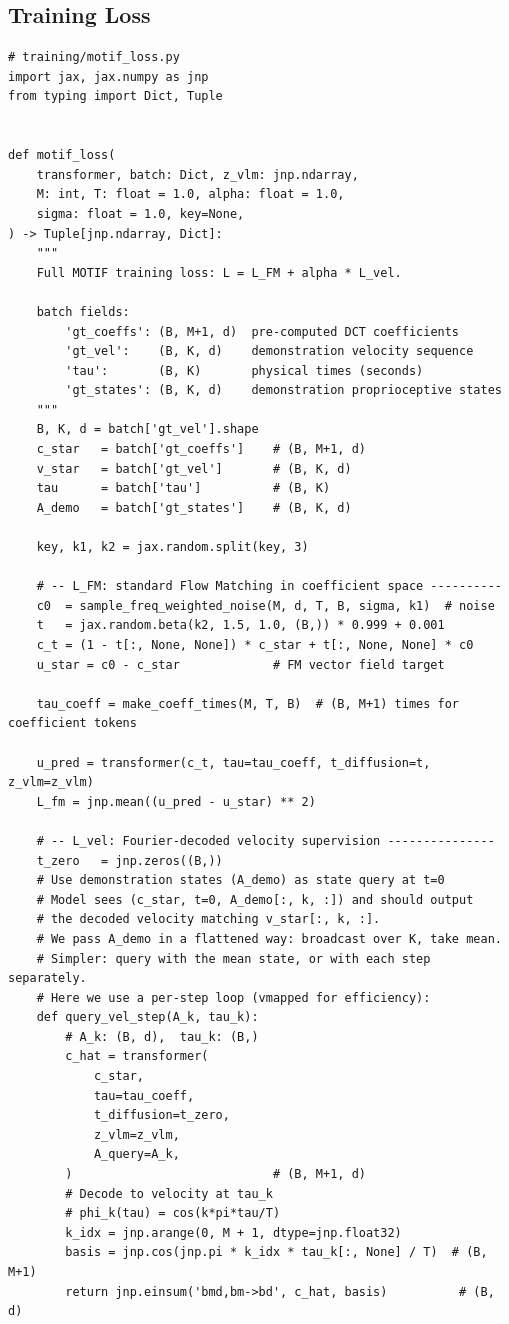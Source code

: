 \documentclass[11pt]{article}
\theoremstyle{plain}
\theoremstyle{definition}
\begin{document}
\subsection{Training Loss}

\begin{verbatim}
# training/motif_loss.py
import jax, jax.numpy as jnp
from typing import Dict, Tuple


def motif_loss(
    transformer, batch: Dict, z_vlm: jnp.ndarray,
    M: int, T: float = 1.0, alpha: float = 1.0,
    sigma: float = 1.0, key=None,
) -> Tuple[jnp.ndarray, Dict]:
    """
    Full MOTIF training loss: L = L_FM + alpha * L_vel.

    batch fields:
        'gt_coeffs': (B, M+1, d)  pre-computed DCT coefficients
        'gt_vel':    (B, K, d)    demonstration velocity sequence
        'tau':       (B, K)       physical times (seconds)
        'gt_states': (B, K, d)    demonstration proprioceptive states
    """
    B, K, d = batch['gt_vel'].shape
    c_star   = batch['gt_coeffs']    # (B, M+1, d)
    v_star   = batch['gt_vel']       # (B, K, d)
    tau      = batch['tau']          # (B, K)
    A_demo   = batch['gt_states']    # (B, K, d)

    key, k1, k2 = jax.random.split(key, 3)

    # -- L_FM: standard Flow Matching in coefficient space ----------
    c0  = sample_freq_weighted_noise(M, d, T, B, sigma, k1)  # noise
    t   = jax.random.beta(k2, 1.5, 1.0, (B,)) * 0.999 + 0.001
    c_t = (1 - t[:, None, None]) * c_star + t[:, None, None] * c0
    u_star = c0 - c_star             # FM vector field target

    tau_coeff = make_coeff_times(M, T, B)  # (B, M+1) times for coefficient tokens

    u_pred = transformer(c_t, tau=tau_coeff, t_diffusion=t, z_vlm=z_vlm)
    L_fm = jnp.mean((u_pred - u_star) ** 2)

    # -- L_vel: Fourier-decoded velocity supervision ---------------
    t_zero   = jnp.zeros((B,))
    # Use demonstration states (A_demo) as state query at t=0
    # Model sees (c_star, t=0, A_demo[:, k, :]) and should output
    # the decoded velocity matching v_star[:, k, :].
    # We pass A_demo in a flattened way: broadcast over K, take mean.
    # Simpler: query with the mean state, or with each step separately.
    # Here we use a per-step loop (vmapped for efficiency):
    def query_vel_step(A_k, tau_k):
        # A_k: (B, d),  tau_k: (B,)
        c_hat = transformer(
            c_star,
            tau=tau_coeff,
            t_diffusion=t_zero,
            z_vlm=z_vlm,
            A_query=A_k,
        )                            # (B, M+1, d)
        # Decode to velocity at tau_k
        # phi_k(tau) = cos(k*pi*tau/T)
        k_idx = jnp.arange(0, M + 1, dtype=jnp.float32)
        basis = jnp.cos(jnp.pi * k_idx * tau_k[:, None] / T)  # (B, M+1)
        return jnp.einsum('bmd,bm->bd', c_hat, basis)          # (B, d)


\end{verbatim}
\end{document}
